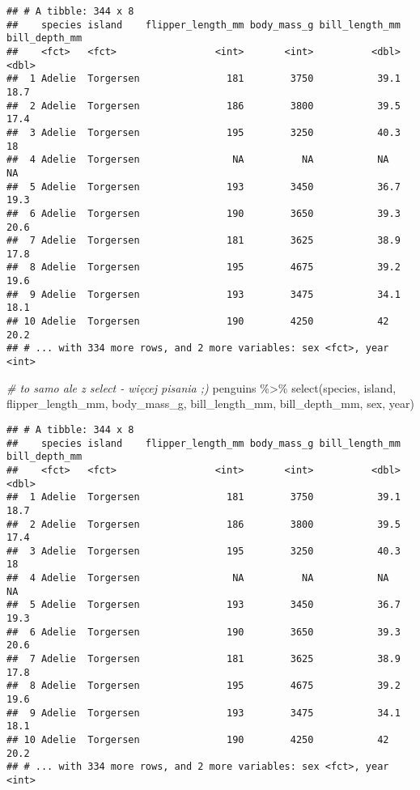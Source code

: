 \documentclass[
]{book}
\newenvironment{Shaded}{\begin{snugshade}}{\end{snugshade}}
\newcommand{\CommentTok}[1]{\textcolor[rgb]{0.56,0.35,0.01}{\textit{#1}}}
\newcommand{\FunctionTok}[1]{\textcolor[rgb]{0.00,0.00,0.00}{#1}}
\newcommand{\NormalTok}[1]{#1}
\newcommand{\SpecialCharTok}[1]{\textcolor[rgb]{0.00,0.00,0.00}{#1}}
\begin{document}
\begin{verbatim}
## # A tibble: 344 x 8
##    species island    flipper_length_mm body_mass_g bill_length_mm bill_depth_mm
##    <fct>   <fct>                 <int>       <int>          <dbl>         <dbl>
##  1 Adelie  Torgersen               181        3750           39.1          18.7
##  2 Adelie  Torgersen               186        3800           39.5          17.4
##  3 Adelie  Torgersen               195        3250           40.3          18  
##  4 Adelie  Torgersen                NA          NA           NA            NA  
##  5 Adelie  Torgersen               193        3450           36.7          19.3
##  6 Adelie  Torgersen               190        3650           39.3          20.6
##  7 Adelie  Torgersen               181        3625           38.9          17.8
##  8 Adelie  Torgersen               195        4675           39.2          19.6
##  9 Adelie  Torgersen               193        3475           34.1          18.1
## 10 Adelie  Torgersen               190        4250           42            20.2
## # ... with 334 more rows, and 2 more variables: sex <fct>, year <int>
\end{verbatim}

\begin{Shaded}
\begin{Highlighting}[]
\CommentTok{\# to samo ale z select {-} więcej pisania ;)}
\NormalTok{penguins }\SpecialCharTok{\%\textgreater{}\%} \FunctionTok{select}\NormalTok{(species, island, flipper\_length\_mm, body\_mass\_g, bill\_length\_mm, bill\_depth\_mm, sex, year)}
\end{Highlighting}
\end{Shaded}

\begin{verbatim}
## # A tibble: 344 x 8
##    species island    flipper_length_mm body_mass_g bill_length_mm bill_depth_mm
##    <fct>   <fct>                 <int>       <int>          <dbl>         <dbl>
##  1 Adelie  Torgersen               181        3750           39.1          18.7
##  2 Adelie  Torgersen               186        3800           39.5          17.4
##  3 Adelie  Torgersen               195        3250           40.3          18  
##  4 Adelie  Torgersen                NA          NA           NA            NA  
##  5 Adelie  Torgersen               193        3450           36.7          19.3
##  6 Adelie  Torgersen               190        3650           39.3          20.6
##  7 Adelie  Torgersen               181        3625           38.9          17.8
##  8 Adelie  Torgersen               195        4675           39.2          19.6
##  9 Adelie  Torgersen               193        3475           34.1          18.1
## 10 Adelie  Torgersen               190        4250           42            20.2
## # ... with 334 more rows, and 2 more variables: sex <fct>, year <int>
\end{verbatim}
\end{document}
